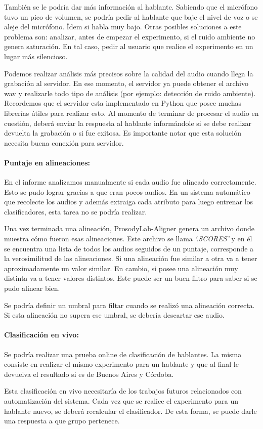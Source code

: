 También se le podría dar más información al hablante. Sabiendo que el micrófono tuvo un pico de volumen, se podría pedir al hablante que baje el nivel de voz o se aleje del micrófono. Ídem si habla muy bajo. Otras posibles soluciones a este problema son: analizar, antes de empezar el experimento, si el ruido ambiente no genera saturación. En tal caso, pedir al usuario que realice el experimento en un lugar más silencioso. 

Podemos realizar análisis más precisos sobre la calidad del audio cuando llega la grabación al servidor. En ese momento, el servidor ya puede obtener el archivo wav y realizarle todo tipo de análisis (por ejemplo: detección de ruido ambiente). Recordemos que el servidor esta implementado en Python que posee muchas librerías útiles para realizar esto. Al momento de terminar de procesar el audio en cuestión, deberá enviar la respuesta al hablante informándole si se debe realizar devuelta la grabación o si fue exitosa. Es importante notar que esta solución necesita buena conexión para servidor. 

\paragraph*{Puntaje en alineaciones:} En el informe analizamos manualmente si cada audio fue alineado correctamente. Esto se pudo lograr gracias a que eran pocos audios. En un sistema automático que recolecte los audios y además extraiga cada atributo para luego entrenar los clasificadores, esta tarea no se podría realizar.     

Una vez terminada una alineación, ProsodyLab-Aligner genera un archivo donde muestra cómo fueron esas alineaciones. Este archivo se llama \textit{`.SCORES’} y en él se encuentra una lista de todos los audios seguidos de un puntaje, corresponde a la verosimilitud de las alineaciones. Si una alineación fue similar a otra va a tener aproximadamente un valor similar. En cambio, si posee una alineación muy distinta va a tener valores distintos. Este puede ser un buen filtro para saber si se pudo alinear bien.

Se podría definir un umbral para filtar cuando se realizó una alineación correcta. Si esta alineación no supera ese umbral, se debería descartar ese audio.   

\paragraph*{Clasificación en vivo:} Se podría realizar una prueba online de clasificación de hablantes. La misma consiste en realizar el mismo experimento para un hablante y que al final le devuelva el resultado si es de Buenos Aires y Córdoba.

Esta clasificación en vivo necesitaría de los trabajos futuros relacionados con automatización del sistema. Cada vez que se realice el experimento para un hablante nuevo, se deberá recalcular el clasificador. De esta forma, se puede darle una respuesta a que grupo pertenece. 
